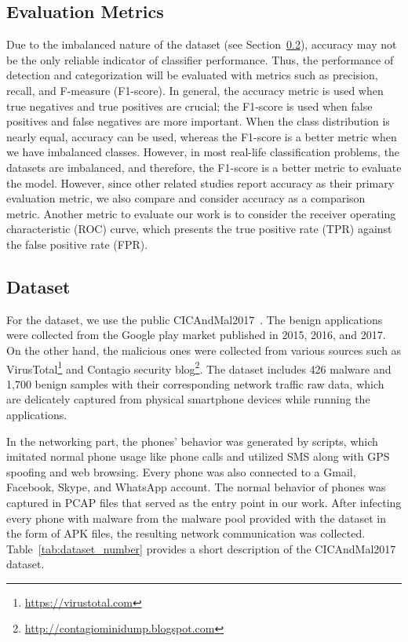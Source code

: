 \documentclass[runningheads]{llncs}
\begin{document}
\subsection{Evaluation Metrics}
\label{sec:eval_metrics}

Due to the imbalanced nature of the dataset (see Section~\ref{sec:Dataset}), accuracy may not be the only reliable indicator of classifier performance. Thus, the performance of detection and categorization will be evaluated with metrics such as precision, recall, and F-measure (F1-score). In general, the accuracy metric is used when true negatives and true positives are crucial; the F1-score is used when false positives and false negatives are more important. When the class distribution is nearly equal, accuracy can be used, whereas the F1-score is a better metric when we have imbalanced classes. However, in most real-life classification problems, the datasets are imbalanced, and therefore, the F1-score is a better metric to evaluate the model. However, since other related studies report accuracy as their primary evaluation metric, we also compare and consider accuracy as a comparison metric. Another metric to evaluate our work is to consider the receiver operating characteristic (ROC) curve, which presents the true positive rate (TPR) against the false positive rate (FPR).


\subsection{Dataset}
\label{sec:Dataset}

For the dataset, we use the public CICAndMal2017~\cite{lashkari2018toward}. The benign applications were collected from the Google play market published in 2015, 2016, and 2017. On the other hand, the malicious ones were collected from various sources such as VirusTotal\footnote{\url{https://virustotal.com}} and Contagio security blog\footnote{\url{http://contagiominidump.blogspot.com}}. The dataset includes 426 malware and 1,700 benign samples with their corresponding network traffic raw data, which are delicately captured from physical smartphone devices while running the applications.

In the networking part, the phones' behavior was generated by scripts, which imitated normal phone usage like phone calls and utilized SMS along with GPS spoofing and web browsing. Every phone was also connected to a Gmail, Facebook, Skype, and WhatsApp account. The normal behavior of phones was captured in PCAP files that served as the entry point in our work. After infecting every phone with malware from the malware pool provided with the dataset in the form of APK files, the resulting network communication was collected. Table~\ref{tab:dataset_number} provides a short description of the CICAndMal2017 dataset.
\end{document}
